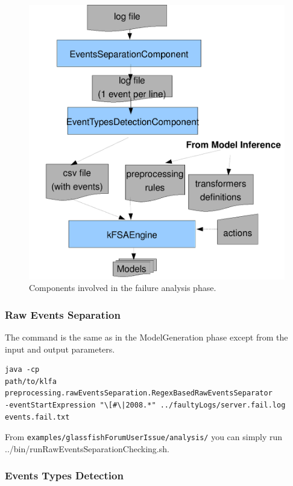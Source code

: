 \begin{figure}[ht!]
    \begin{center}
        \includegraphics[width=13cm]{images/failureAnalysis}
    \end{center}
    \caption{Components involved in the failure analysis phase.}
\label{fig:failureAnalysis}
\end{figure}

\subsubsection*{Raw Events Separation}

The command is the same as in the ModelGeneration phase except from
the input and output parameters.


\begin{verbatim}
java -cp
path/to/klfa
preprocessing.rawEventsSeparation.RegexBasedRawEventsSeparator 
-eventStartExpression "\[#\|2008.*" ../faultyLogs/server.fail.log
events.fail.txt
\end{verbatim}

From \texttt{examples/glassfishForumUserIssue/analysis/} you can simply run
../bin/runRawEventsSeparationChecking.sh.

\subsubsection*{Events Types Detection}


